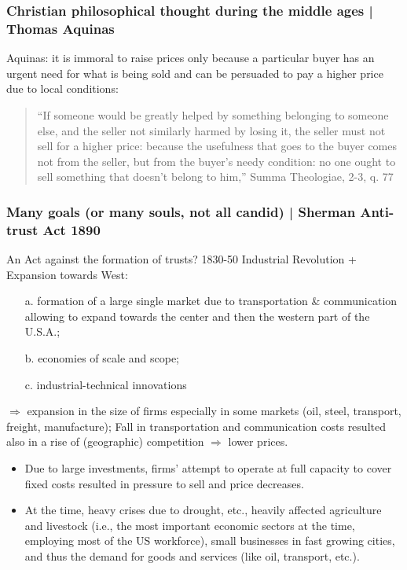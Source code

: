             \subsubsection{Christian philosophical thought during the middle ages | Thomas Aquinas}
                Aquinas: it is immoral to raise prices only because a particular buyer has an urgent need for what is being sold and can be persuaded to pay a higher price due to local conditions:
                \begin{quote}
                    “If someone would be greatly helped by something belonging to someone else, and the seller not similarly harmed by losing it, the seller must not sell for a higher price: because the usefulness that goes to the buyer comes not from the seller, but from the buyer's needy condition: no one ought to sell something that doesn't belong to him,” Summa Theologiae, 2-3, q. 77 
                \end{quote}

            \subsubsection{Many goals (or many souls, not all candid) | Sherman Anti-trust Act 1890 }   
                An Act against the formation of trusts?
                1830-50 Industrial Revolution + Expansion towards West: 
                \begin{itemize}
                    \item[a.] formation of a large single market due to transportation \& communication allowing to expand towards the center and then the western part of the U.S.A.; 
                    \item[b.] economies of scale and scope; 
                    \item[c.] industrial-technical innovations
                \end{itemize} 
                \(\Rightarrow\) expansion in the size of firms especially in some markets (oil, steel, transport, freight, manufacture); 
                Fall in transportation and communication costs resulted also in a rise of (geographic) competition \(\Rightarrow\) lower prices.

            \begin{itemize}
                \item Due to large investments, firms’ attempt to operate at full capacity to cover fixed costs resulted in pressure to sell and price decreases.
                \item At the time, heavy crises due to drought, etc., heavily affected agriculture and livestock (i.e., the most important economic sectors at the time, employing most of the US workforce), small businesses in fast growing cities, and thus the demand for goods and services (like oil, transport, etc.). 
            \end{itemize}

